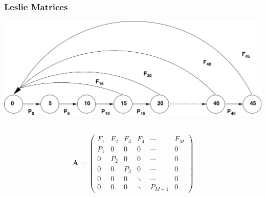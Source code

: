 \documentclass{beamer}
\begin{document}
\begin{frame}
  \frametitle{Leslie Matrices}
	  \begin{center}
          \includegraphics[width=.8\textwidth]{life-cycle.pdf}\
	  \end{center}
    \pause

	  \begin{center}
	  \small
          \begin{equation*}
            \label{eq:A}
            \mathbf{A} = 
            \left( \begin{array}{cccccc}
                    F_1 & F_2 & F_3 & F_4    & \cdots  & F_{M}   \\
                    P_1 & 0   & 0   & 0      & \cdots  & 0       \\
                    0   & P_2 & 0   & 0      & \cdots  & 0       \\
                    0   & 0   & P_3 & 0      & \cdots  & 0       \\
                    0   & 0   & 0   & \ddots & \cdots  & 0       \\
                    0   & 0   & 0   & \ddots & P_{M-1} & 0
                   \end{array} \right)
          \end{equation*}
	  \end{center}

\end{frame}
\end{document}
